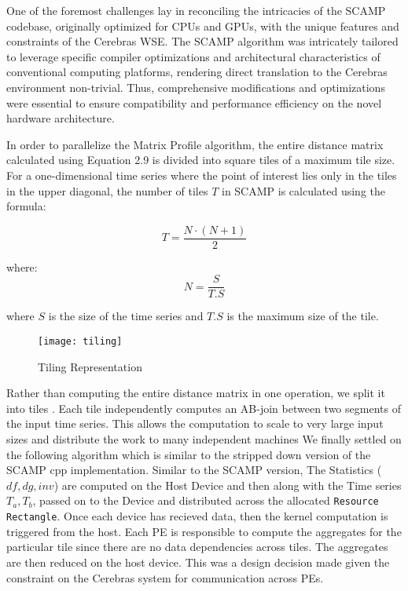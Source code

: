 One of the foremost challenges lay in reconciling the intricacies of the SCAMP codebase, originally optimized for CPUs and GPUs, with the unique features and constraints of the Cerebras WSE. The SCAMP algorithm was intricately tailored to leverage specific compiler optimizations and architectural characteristics of conventional computing platforms, rendering direct translation to the Cerebras environment non-trivial. Thus, comprehensive modifications and optimizations were essential to ensure compatibility and performance efficiency on the novel hardware architecture.

In order to parallelize the Matrix Profile algorithm, the entire distance matrix calculated using Equation 2.9 is divided into square tiles of a maximum tile size. For a one-dimensional time series where the point of interest lies only in the tiles in the upper diagonal, the number of tiles \(T\) in SCAMP is calculated using the formula:


\begin{equation}
    T = \frac{N \cdot (N + 1)}{2}
\end{equation}

where:
\[
N = \frac{S}{T.S}
\]

where $S$ is the size of the time series and $T.S$ is the maximum size of the tile.


\begin{figure}[h!]
    \texttt{[image: tiling]}
    \centering
    \caption{Tiling Representation}
\end{figure}

Rather than computing the entire distance matrix in one operation, we split it into tiles . Each tile independently computes
an AB-join between two segments of the input time series. This
allows the computation to scale to very large input sizes and
distribute the work to many independent machines
We finally settled on the following algorithm which is similar to the stripped down version of the SCAMP cpp implementation. Similar to the SCAMP version, The Statistics (\(df, dg, inv\)) are computed on the Host Device and then along with the Time series \(T_a, T_b\), passed on to the Device and distributed across the allocated \texttt{Resource Rectangle}. Once each device has recieved data, then the kernel computation is triggered from the host. Each PE is responsible to compute the aggregates for the particular tile since there are no data dependencies across tiles. The aggregates are then reduced on the host device. This was a design decision made given the constraint on the Cerebras system for communication across PEs.

